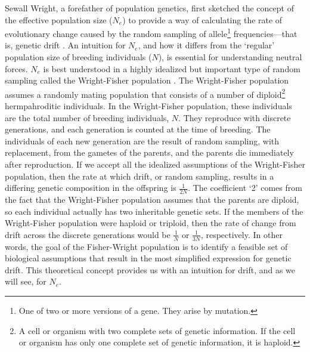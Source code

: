 \documentclass[twocolumn]{article}
\begin{document}
Sewall Wright, a forefather of population genetics, first sketched the concept of the effective population size ($N_e$) to provide a way of calculating the rate of evolutionary change caused by the random sampling of allele\footnote{One of two or more versions of a gene. They arise by mutation.} frequencies---that is, genetic drift \cite{wright_1931}. An intuition for $N_e$, and how it differs from the `regular' population size of breeding individuals ($N$), is essential for understanding neutral forces. $N_e$ is best understood in a highly idealized but important type of random sampling called the Wright-Fisher population \cite{wright_1931, fisher_1923, fisher_1931}. The Wright-Fisher population assumes a randomly mating population that consists of a number of diploid\footnote{A cell or organism with two complete sets of genetic information. If the cell or organism has only one complete set of genetic information, it is haploid.} hermpahroditic individuals. In the Wright-Fisher population, these individuals are the total number of breeding individuals, $N$. They reproduce with discrete generations, and each generation is counted at the time of breeding. The individuals of each new generation are the result of random sampling, with replacement, from the gametes of the parents, and the parents die immediately after reproduction. If we accept all the idealized assumptions of the Wright-Fisher population, then the rate at which drift, or random sampling, results in a differing genetic composition in the offspring is $\frac{1}{2N}$. The coefficient `2' comes from the fact that the Wright-Fisher population assumes that the parents are diploid, so each individual actually has two inheritable genetic sets. If the members of the Wright-Fisher population were haploid or triploid, then the rate of change from drift across the discrete generations would be $\frac{1}{N}$ or $\frac{1}{3N}$, respectively. In other words, the goal of the Fisher-Wright population is to identify a feasible set of biological assumptions that result in the most simplified expression for genetic drift. This theoretical concept provides us with an intuition for drift, and as we will see, for $N_e$. 
\end{document}
